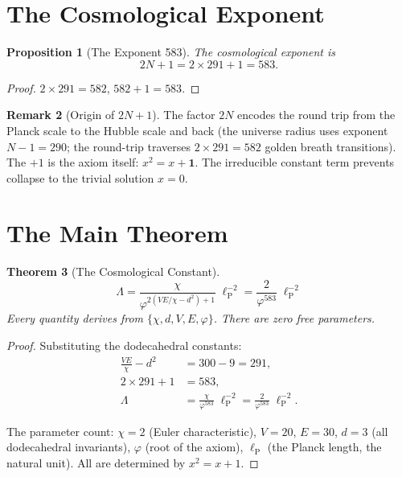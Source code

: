 \documentclass[11pt,a4paper]{article}
\theoremstyle{plain}
\newtheorem{theorem}{Theorem}[section]
\newtheorem{proposition}[theorem]{Proposition}
\theoremstyle{definition}
\newtheorem{remark}[theorem]{Remark}
\newcommand{\lP}{\ell_{\mathrm{P}}}
\newcommand{\vp}{\varphi}
\begin{document}
\section{The Cosmological Exponent}\label{sec:exponent}

\begin{proposition}[The Exponent 583]\label{prop:583}
The cosmological exponent is
\[
  2N + 1 = 2 \times 291 + 1 = 583.
\]
\end{proposition}

\begin{proof}
$2 \times 291 = 582$, $582 + 1 = 583$.
\end{proof}

\begin{remark}[Origin of $2N + 1$]\label{rem:2N1}
The factor $2N$ encodes the round trip from the Planck scale to the
Hubble scale and back (the universe radius uses exponent $N - 1 = 290$;
the round-trip traverses $2 \times 291 = 582$ golden breath transitions).
The $+1$ is the axiom itself: $x^2 = x + \mathbf{1}$.  The irreducible
constant term prevents collapse to the trivial solution $x = 0$.
\end{remark}

\section{The Main Theorem}\label{sec:main}

\begin{theorem}[The Cosmological Constant]\label{thm:main}
\[
  \boxed{\;
    \Lambda
    = \frac{\chi}{\vp^{2(VE/\chi - d^2) + 1}} \;\lP^{-2}
    = \frac{2}{\vp^{583}} \;\lP^{-2}
  \;}
\]
Every quantity derives from $\{\chi, d, V, E, \vp\}$.  There are zero
free parameters.
\end{theorem}

\begin{proof}
Substituting the dodecahedral constants:
\begin{align*}
  \frac{VE}{\chi} - d^2 &= 300 - 9 = 291, \\
  2 \times 291 + 1 &= 583, \\
  \Lambda &= \frac{\chi}{\vp^{583}} \;\lP^{-2}
           = \frac{2}{\vp^{583}} \;\lP^{-2}.
\end{align*}

The parameter count: $\chi = 2$ (Euler characteristic), $V = 20$,
$E = 30$, $d = 3$ (all dodecahedral invariants), $\vp$ (root of the
axiom), $\lP$ (the Planck length, the natural unit).
All are determined by $x^2 = x + 1$.
\end{proof}
\end{document}
